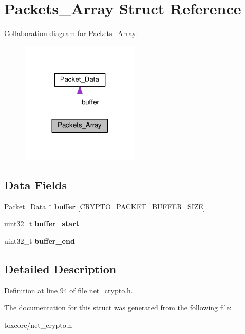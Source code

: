 \hypertarget{struct_packets___array}{\section{Packets\+\_\+\+Array Struct Reference}
\label{struct_packets___array}
}


Collaboration diagram for Packets\+\_\+\+Array\+:\nopagebreak
\begin{figure}[H]
\begin{center}
\leavevmode
\includegraphics[width=161pt]{struct_packets___array__coll__graph}
\end{center}
\end{figure}
\subsection*{Data Fields}
\begin{DoxyCompactItemize}
\item 
\hypertarget{struct_packets___array_ae9d4e6271fdb80e86ebb3e846fcd709c}{\hyperlink{struct_packet___data}{Packet\+\_\+\+Data} $\ast$ {\bfseries buffer} \mbox{[}C\+R\+Y\+P\+T\+O\+\_\+\+P\+A\+C\+K\+E\+T\+\_\+\+B\+U\+F\+F\+E\+R\+\_\+\+S\+I\+Z\+E\mbox{]}}\label{struct_packets___array_ae9d4e6271fdb80e86ebb3e846fcd709c}

\item 
\hypertarget{struct_packets___array_a85973b335814248c05f63543876b348e}{uint32\+\_\+t {\bfseries buffer\+\_\+start}}\label{struct_packets___array_a85973b335814248c05f63543876b348e}

\item 
\hypertarget{struct_packets___array_a66d710e0093872b26ee80118c1a85d99}{uint32\+\_\+t {\bfseries buffer\+\_\+end}}\label{struct_packets___array_a66d710e0093872b26ee80118c1a85d99}

\end{DoxyCompactItemize}


\subsection{Detailed Description}


Definition at line 94 of file net\+\_\+crypto.\+h.



The documentation for this struct was generated from the following file\+:\begin{DoxyCompactItemize}
\item 
toxcore/net\+\_\+crypto.\+h\end{DoxyCompactItemize}
